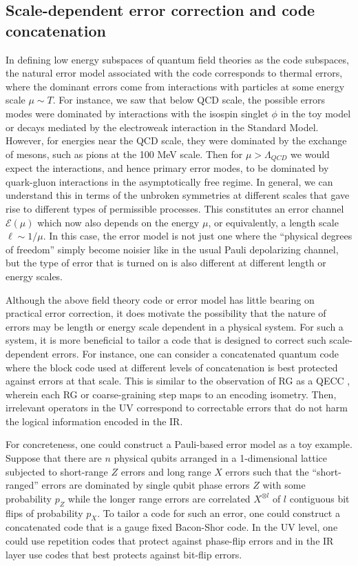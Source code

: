 \documentclass[11pt,english]{article}
\begin{document}
\subsection{Scale-dependent error correction and code concatenation}

In defining low energy subspaces of quantum field theories as the code subspaces, the natural error model associated with the code corresponds to thermal errors, where the dominant errors come from interactions with particles at some energy scale $\mu\sim T$. For instance, we saw that below QCD scale, the possible errors modes were dominated by interactions with the isospin singlet $\phi$ in the toy model or decays mediated by the electroweak interaction in the Standard Model. However, for energies near the QCD scale, they were dominated by the exchange of mesons, such as pions at the 100 MeV scale. Then for $\mu>\Lambda_{QCD}$ we would expect the interactions, and hence primary error modes, to be  dominated by quark-gluon interactions in the asymptotically free regime. In general, we can understand this in terms of the unbroken symmetries at different scales that gave rise to different types of permissible processes. This constitutes an error channel $\mathcal{E}(\mu)$ which now also depends on the energy $\mu$, or equivalently, a length scale $\ell\sim 1/\mu$. In this case, the error model is not just one where the ``physical degrees of freedom'' simply become noisier like in the usual Pauli depolarizing channel, but the type of error that is turned on is also different at different length or energy scales. 

Although the above field theory code or error model has little bearing on practical error correction, it does motivate the possibility that the nature of errors may be length or energy scale dependent in a physical system. For such a system, it is more beneficial to tailor a code that is designed to correct such scale-dependent errors. For instance, one can consider a concatenated quantum code where the block code used at different levels of concatenation is best protected against errors at that scale. This is similar to the observation of RG as a QECC \cite{Furuya_2022,Furuya1_2022}, wherein each RG or coarse-graining step maps to an encoding isometry. Then, irrelevant operators in the UV correspond to correctable errors that do not harm the logical information encoded in the IR.

For concreteness, one could construct a Pauli-based error model as a toy example. Suppose that there are $n$ physical qubits arranged in a 1-dimensional lattice subjected to short-range $Z$ errors and long range $X$ errors such that the ``short-ranged'' errors are dominated by single qubit phase errors $Z$ with some probability $p_Z$ while the longer range errors are correlated $X^{\otimes l}$ of $l$ contiguous bit flips of probability $p_X$. To tailor a code for such an error, one could construct a concatenated code that is a gauge fixed Bacon-Shor code. In the UV level, one could use repetition codes that protect against phase-flip errors and in the IR layer use codes that best protects against bit-flip errors.
\end{document}
